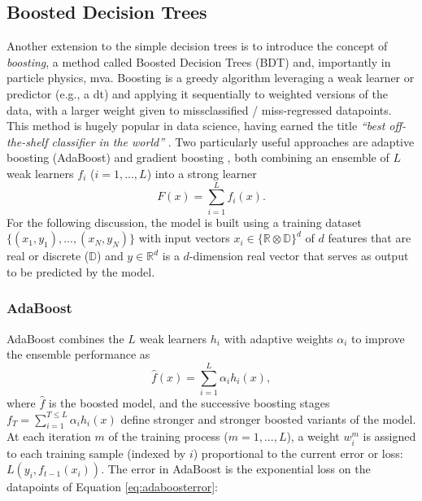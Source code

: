 \subsection{Boosted Decision Trees}
Another extension to the simple decision trees is to introduce the concept of \textit{boosting}, a method called Boosted Decision Trees (BDT) and, importantly in particle physics, \gls{mva}. Boosting is a greedy algorithm leveraging a weak learner or predictor (e.g., a \gls{dt}) and applying it sequentially to weighted versions of the data, with a larger weight given to missclassified / miss-regressed datapoints. This method is hugely popular in data science, having earned the title \textit{``best off-the-shelf classifier in the world''} \cite{baggingML}. Two particularly useful approaches are adaptive boosting (AdaBoost) \cite{Adaboost} and gradient boosting \cite{gradientBoosting}, both combining an ensemble of $L$ weak learners $f_i$ ($i = 1, ..., L$) into a strong learner \[F(x) = \sum_{i=1}^L f_i(x).\] For the following discussion, the model is built using a training dataset $ \{(x_1, y_1), ..., (x_N, y_N)\}$ with input vectors $x_i \in \{\mathbb{R} \otimes \mathbb{D}\}^d$ of $d$ features that are real or discrete ($\mathbb{D}$) and $y \in \mathbb{R}^d$ is a $d$-dimension real vector that serves as output to be predicted by the model.

\subsubsection{AdaBoost}
AdaBoost combines the $L$ weak learners $h_i$ with adaptive weights $\alpha_i$ to improve the ensemble performance as \[\hat{f}(x) = \sum_{i=1}^L \alpha_i h_i(x),\] where $\hat{f}$ is the boosted model, and the successive boosting stages $f_T = \sum_{i=1}^{T \leq L} \alpha_i h_i(x)$ define stronger and stronger boosted variants of the model. At each iteration $m$ of the training process ($m = 1, ..., L$), a weight $w_i^m$ is assigned to each training sample (indexed by $i$) proportional to the current error or loss: $L(y_i, f_{t-1}(x_i))$. The error in AdaBoost is the exponential loss on the datapoints of Equation \ref{eq:adaboosterror}:

